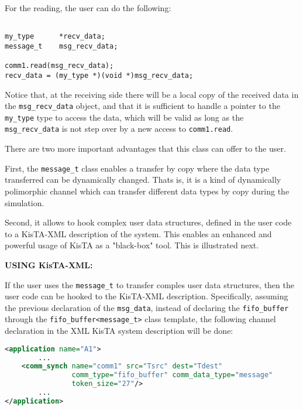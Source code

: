 For the reading, the user can do the following:
\begin{lstlisting}[style=KistaCodeStyle,caption={Declare a complex data structure and load it with data received from a fifo buffer.}, label=complex_struct_value_use_read]

my_type      *recv_data;
message_t    msg_recv_data;

comm1.read(msg_recv_data);
recv_data = (my_type *)(void *)msg_recv_data;
\end{lstlisting}

Notice that, at the receiving side there will be a local copy of the received data in the \texttt{msg\_recv\_data} object, and that it is sufficient to handle a pointer to the \texttt{my\_type} type to access the data, which will be valid as long as the \texttt{msg\_recv\_data} is not step over by a new access to \texttt{comm1.read}.

There are two more important advantages that this class can offer to the user.

First, the \texttt{message\_t} class enables a transfer by copy where the data type transferred can be dynamically changed. Thats is, it is a kind of dynamically polimorphic channel which can transfer different data types by copy during the simulation.

Second, it allows to hook complex user data structures, defined in the user code to a KisTA-XML description of the system. This enables an enhanced and powerful usage of KisTA as a "black-box" tool. This is illustrated next.

\textbf{USING KisTA-XML:}

If the user uses the \texttt{message\_t} to transfer comples user data structures, then the user code can be hooked to the KisTA-XML description. Specifically, assuming the previous declaration of the \texttt{msg\_data}, instead of declaring the \texttt{fifo\_buffer} through the \texttt{fifo\_buffer<message\_t>} class template,  the following channel declaration in the XML KisTA system description will be done:

\begin{lstlisting}[language=XML, caption={Declaration of KisTA fifo buffer transporting a complex user structure in the XML interface.}, label=complex_struct_value_xml]
<application name="A1">
        ...
    <comm_synch name="comm1" src="Tsrc" dest="Tdest"
                comm_type="fifo_buffer" comm_data_type="message"
                token_size="27"/>
        ...
</application>
\end{lstlisting}


